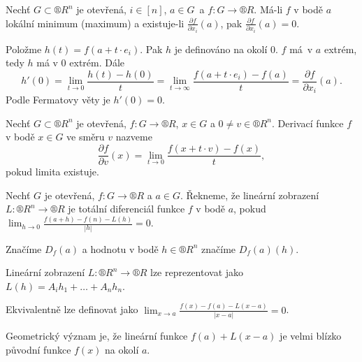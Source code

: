\documentclass[12pt]{article}					%
\begin{document}

	\begin{veta}
		Nechť $G \subset ®R^n$ je otevřená, $i \in [n]$, $a \in G$ a $f: G \rightarrow ®R$. Má-li $f$ v bodě $a$ lokální minimum (maximum) a existuje-li $\frac{\partial f}{\partial x_i}(a)$, pak $\frac{\partial f}{\partial x_i}(a) = 0$.

		\begin{dukazin}
			Položme $h(t) = f(a + t·e_i)$. Pak $h$ je definováno na okolí 0. $f$ má v $a$ extrém, tedy $h$ má v 0 extrém. Dále
			$$ h'(0) = \lim_{t \rightarrow 0} \frac{h(t) - h(0)}{t} = \lim_{t \rightarrow ∞} \frac{f(a + t·e_i) - f(a)}{t} = \frac{\partial f}{\partial x_i}(a). $$
			Podle Fermatovy věty je $h'(0) = 0$.
		\end{dukazin}
	\end{veta}

	\begin{definice}
		Nechť $G \subset ®R^n$ je otevřená, $f: G \rightarrow ®R$, $x \in G$ a $0 ≠ v \in ®R^n$. Derivací funkce $f$ v bodě $x \in G$ ve směru $v$ nazveme
		$$ \frac{\partial f}{\partial v}(x) = \lim_{t \rightarrow 0} \frac{f(x + t·v) - f(x)}{t}, $$
		pokud limita existuje.
	\end{definice}

	\begin{definice}
		Nechť $G$ je otevřená, $f: G \rightarrow ®R$ a $a \in G$. Řekneme, že lineární zobrazení $L: ®R^n \rightarrow ®R$ je totální diferenciál funkce $f$ v bodě $a$, pokud $\lim_{h \rightarrow 0} \frac{f(a + h) - f(n) - L(h)}{|h|} = 0$.

		Značíme $D_f(a)$ a hodnotu v bodě $h \in ®R^n$ značíme $D_f(a)(h)$.
	\end{definice}

	\begin{poznamka}
		Lineární zobrazení $L: ®R^n \rightarrow ®R$ lze reprezentovat jako $L(h) = A_ih_1 + … + A_nh_n$.

		Ekvivalentně lze definovat jako $\lim_{x \rightarrow a} \frac{f(x) - f(a) - L(x-a)}{|x-a|} = 0$.

		Geometrický význam je, že lineární funkce $f(a) + L(x - a)$ je velmi blízko původní funkce $f(x)$ na okolí $a$.
	\end{poznamka}
\end{document}
